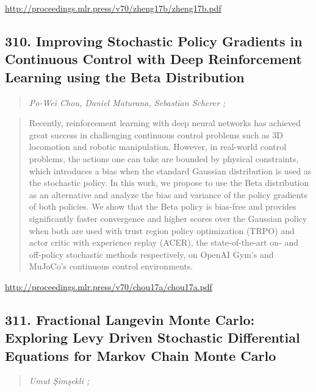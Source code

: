 \documentclass{article}
\begin{document}
\href{http://proceedings.mlr.press/v70/zheng17b/zheng17b.pdf}{http://proceedings.mlr.press/v70/zheng17b/zheng17b.pdf}

\subsection{310. Improving Stochastic Policy Gradients in Continuous Control with Deep Reinforcement Learning using the Beta Distribution}

\begin{quote}
\footnotesize{\textit{Po-Wei Chou, Daniel Maturana, Sebastian Scherer ;}}

\end{quote}

\begin{quote}
    Recently, reinforcement learning with deep neural networks has achieved great success in challenging continuous control problems such as 3D locomotion and robotic manipulation. However, in real-world control problems, the actions one can take are bounded by physical constraints, which introduces a bias when the standard Gaussian distribution is used as the stochastic policy. In this work, we propose to use the Beta distribution as an alternative and analyze the bias and variance of the policy gradients of both policies. We show that the Beta policy is bias-free and provides significantly faster convergence and higher scores over the Gaussian policy when both are used with trust region policy optimization (TRPO) and actor critic with experience replay (ACER), the state-of-the-art on- and off-policy stochastic methods respectively, on OpenAI Gym’s and MuJoCo’s continuous control environments.  
\end{quote}

\href{http://proceedings.mlr.press/v70/chou17a/chou17a.pdf}{http://proceedings.mlr.press/v70/chou17a/chou17a.pdf}

\subsection{311. Fractional Langevin Monte Carlo: Exploring Levy Driven Stochastic Differential Equations for Markov Chain Monte Carlo}

\begin{quote}
\footnotesize{\textit{Umut Şimşekli ;}}

\end{quote}
\end{document}
